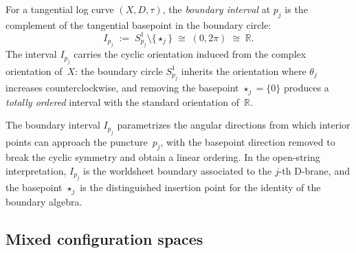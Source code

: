\begin{definition}
\label{def:boundary-intervals}
For a tangential log curve $(X, D, \tau)$, the
\emph{boundary interval} at $p_j$ is the complement of the
tangential basepoint in the boundary circle:
\begin{equation}\label{eq:boundary-interval}
I_{p_j}
\;:=\;
S^1_{p_j} \setminus \{\star_j\}
\;\cong\;
(0, 2\pi)
\;\cong\;
\mathbb{R}.
\end{equation}
The interval $I_{p_j}$ carries the cyclic orientation induced from
the complex orientation of~$X$: the boundary circle $S^1_{p_j}$
inherits the orientation where $\theta_j$ increases
counterclockwise, and removing the basepoint
$\star_j = \{0\}$ produces a \emph{totally ordered} interval
with the standard orientation of~$\mathbb{R}$.
\end{definition}

\begin{remark}
\label{rem:geometric-interval-meaning}
The boundary interval $I_{p_j}$ parametrizes the angular
directions from which interior points can approach the
puncture~$p_j$, with the basepoint direction removed to break
the cyclic symmetry and obtain a linear ordering.  In the
open-string interpretation, $I_{p_j}$ is the worldsheet boundary
associated to the $j$-th D-brane, and the basepoint $\star_j$ is
the distinguished insertion point for the identity of the
boundary algebra.
\end{remark}

\subsection{Mixed configuration spaces}
\label{subsec:mixed-config-spaces}

